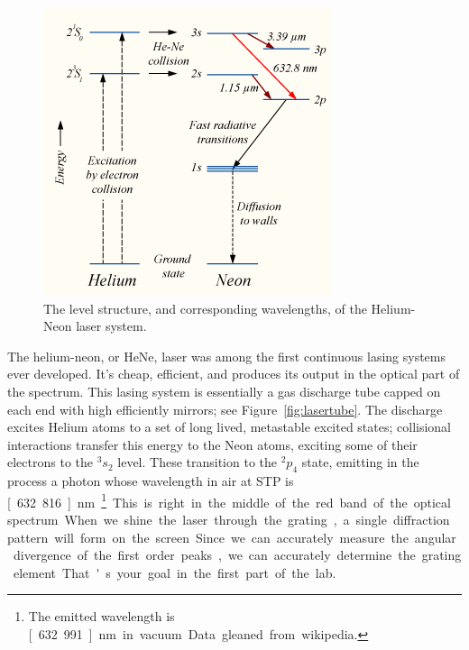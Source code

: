 \documentclass[12pt]{article}
\begin{document}
\begin{figure}
  \centering
  \includegraphics[width=2\textwidth/3]{figures/Hene-2}
  \caption{The level structure, and corresponding wavelengths, of the
    Helium-Neon laser system.}
  \label{fig:levels}
\end{figure}

The helium-neon, or HeNe, laser was among the first continuous lasing
systems ever developed.  It's cheap, efficient, and produces its
output in the optical part of the spectrum.  This lasing system is
essentially a gas discharge tube capped on each end with high
efficiently mirrors; see Figure~\ref{fig:lasertube}.  The discharge
excites Helium atoms to a set of long lived, metastable excited
states; collisional interactions transfer this energy to the Neon
atoms, exciting some of their electrons to the $^3s_2$ level.  These
transition to the $^2p_4$ state, emitting in the process a photon
whose wavelength in air at STP is \unit[632.816]{nm}.\footnote{The
  emitted wavelength is \unit[632.991]{nm} in vacuum.  Data gleaned
  from wikipedia.}  This is right in the middle of the red band of the
optical spectrum.

When we shine the laser through the grating, a single diffraction
pattern will form on the screen.  Since we can accurately measure the
angular divergence of the first order peaks, we can accurately
determine the grating element.  That's your goal in the first part of
the lab.
\end{document}
